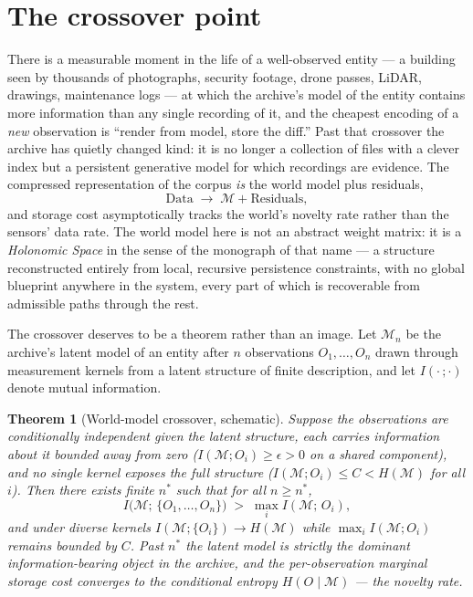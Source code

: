 \documentclass[11pt,oneside]{book}
\newtheorem{theorem}{Theorem}[chapter]
\theoremstyle{remark}
\newcommand{\Mod}{\mathcal{M}}
\begin{document}
\section{The crossover point}

There is a measurable moment in the life of a well-observed entity --- a
building seen by thousands of photographs, security footage, drone
passes, LiDAR, drawings, maintenance logs --- at which the archive's
model of the entity contains more information than any single recording
of it, and the cheapest encoding of a \emph{new} observation is
``render from model, store the diff.'' Past that crossover the archive
has quietly changed kind: it is no longer a collection of files with a
clever index but a persistent generative model for which recordings are
evidence. The compressed representation of the corpus \emph{is} the
world model plus residuals,
\[
\text{Data} \;\longrightarrow\; \Mod + \text{Residuals},
\]
and storage cost asymptotically tracks the world's novelty rate rather
than the sensors' data rate. The world model here is not an abstract
weight matrix: it is a \emph{Holonomic Space} in the sense of the
monograph of that name --- a structure reconstructed entirely from
local, recursive persistence constraints, with no global blueprint
anywhere in the system, every part of which is recoverable from
admissible paths through the rest.

The crossover deserves to be a theorem rather than an image. Let
$\Mod_n$ be the archive's latent model of an entity after $n$
observations $O_1, \dots, O_n$ drawn through measurement kernels from a
latent structure of finite description, and let $I(\cdot\,;\cdot)$
denote mutual information.

\begin{theorem}[World-model crossover, schematic]
Suppose the observations are conditionally independent given the latent
structure, each carries information about it bounded away from zero
($I(\Mod; O_i) \ge \epsilon > 0$ on a shared component), and no single
kernel exposes the full structure ($I(\Mod; O_i) \le C <
H(\Mod)$ for all $i$). Then there exists finite $n^\ast$ such that for
all $n \ge n^\ast$,
\[
I\bigl(\Mod;\, \{O_1, \dots, O_n\}\bigr) \;>\; \max_i I(\Mod;\, O_i),
\]
and under diverse kernels
$I(\Mod; \{O_i\}) \to H(\Mod)$ while $\max_i I(\Mod; O_i)$ remains
bounded by $C$. Past $n^\ast$ the latent model is strictly the dominant
information-bearing object in the archive, and the per-observation
marginal storage cost converges to the conditional entropy
$H(O \mid \Mod)$ --- the novelty rate.
\end{theorem}
\end{document}
